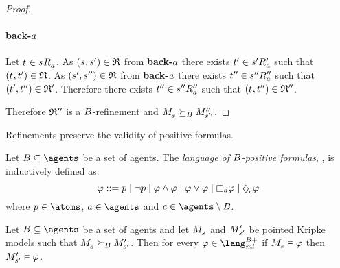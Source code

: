 \begin{proof}
    \paragraph{back-$a$}
    Let $\kStateT \in \kSuccessorsA{\kStateS}$.
    As $(\kStateS, \kStateSP) \in \refinement$ from {\bf back-$a$} there exists ${t}^{\prime} \in {{s}^{\prime}} {R^{\prime}_{a}}$ such that $(\kStateT, \kStateTP) \in \refinement$.
    As $({s}^{\prime}, {s}^{\prime\prime}) \in \mathfrak{R}$ from {\bf back-$a$} there exists ${t}^{\prime\prime} \in {{s}^{\prime\prime}} {R^{\prime\prime}_{a}}$ such that $({t}^{\prime}, {t}^{\prime\prime}) \in \mathfrak{R}'$.
    Therefore there exists ${t}^{\prime\prime} \in {{s}^{\prime\prime}} {R^{\prime\prime}_{a}}$ such that $(\kStateT, \kStateTPP) \in \refinement''$.

    Therefore $\mathfrak{R}''$ is a $B$-refinement and $\kPModel{\kStateS} \simulatesBs \kPModelPP{\kStateSPP}$. 
\end{proof}

Refinements preserve the validity of positive formulas.

\begin{definition}
Let $\agentsB \subseteq \agents$ be a set of agents.
The {\em language of $B$-positive formulas}, \langMlPlusBs{}, is inductively defined as:
$$
\phi ::= 
    \atomP \mid
    \lnot \atomP \mid
    \phi \land \phi \mid
    \phi \lor \phi \mid
    \necessaryA \phi \mid
    \possibleC \phi
$$
where $\atomP \in \atoms$, $\agentA \in \agents$ and $\agentC \in \agents \setminus \agentsB$.
\end{definition}

\begin{proposition}\label{refinements-preserve-positive}
Let $\agentsB \subseteq \agents$ be a set of agents and let $\kPModel{\kStateS}$ and ${M^{\prime}_{{s}^{\prime}}}$ be pointed Kripke models such that $\kPModel{\kStateS} \simulatesBs \kPModelP{\kStateSP}$.
Then for every $\phi \in \langMlPlusBs$
if $\kPModel{\kStateS} \entails \phi$ then ${M^{\prime}_{{s}^{\prime}}} \vDash \varphi$.
\end{proposition}

